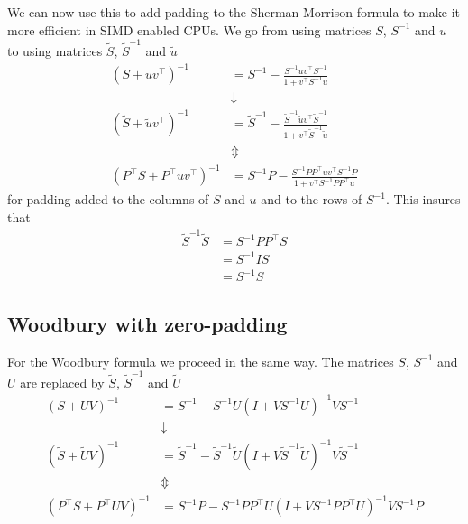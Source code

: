 \documentclass[11pt]{article}
\numberwithin{figure}{section}
\numberwithin{table}{section}
\begin{document}
\begin{appendices}
    We can now use this to add padding to the Sherman-Morrison formula to make it more efficient in SIMD enabled CPUs. We go from using matrices $S$, $S^{-1}$ and $u$ to using matrices $\widetilde{S}$, $\widetilde{S}^{-1}$ and $\widetilde{u}$
    \begin{align}
    	\left(S+uv^\top \right)^{-1} &= S^{-1}-\frac{S^{-1}uv^\top S^{-1}}{1+v^\top S^{-1}u} \\
    								&\downarrow \\
    	\left(\widetilde{S}+\widetilde{u}v^\top \right)^{-1} &= \widetilde{S}^{-1}-\frac{\widetilde{S}^{-1}\widetilde{u}v^\top \widetilde{S}^{-1}}{1+v^\top \widetilde{S}^{-1}\widetilde{u}} \\
    								&\Updownarrow \\
    	\left(P^\top S+P^\top uv^\top \right)^{-1} &= S^{-1}P-\frac{S^{-1}PP^\top uv^\top S^{-1}P}{1+v^\top S^{-1}PP^\top u}	
    \end{align}
    for padding added to the columns of $S$ and $u$ and to the rows of $S^{-1}$. This insures that
    \begin{align}
    	\widetilde{S}^{-1}\widetilde{S} &= S^{-1}PP^\top S \\
    									&= S^{-1}IS \\
    									&= S^{-1}S
    \end{align}

  \subsection{Woodbury with zero-padding}
    For the Woodbury formula we proceed in the same way. The matrices $S$, $S^{-1}$ and $U$ are replaced by $\widetilde{S}$, $\widetilde{S}^{-1}$ and $\widetilde{U}$
    \begin{align}
    \left(S+UV\right)^{-1} &= S^{-1} - S^{-1}U(I+VS^{-1}U)^{-1}VS^{-1}\\
    	&\downarrow \\
    \left(\widetilde{S}+\widetilde{U}V\right)^{-1} &= \widetilde{S}^{-1} - \widetilde{S}^{-1}\widetilde{U}(I+V\widetilde{S}^{-1}\widetilde{U})^{-1}V\widetilde{S}^{-1} \\
    		&\Updownarrow \\
    \left(P^\top S+P^\top UV\right)^{-1} &= S^{-1}P - S^{-1}PP^\top U(I+VS^{-1}PP^\top U)^{-1}VS^{-1}P
    \end{align}
\end{appendices}



		
\end{document}
